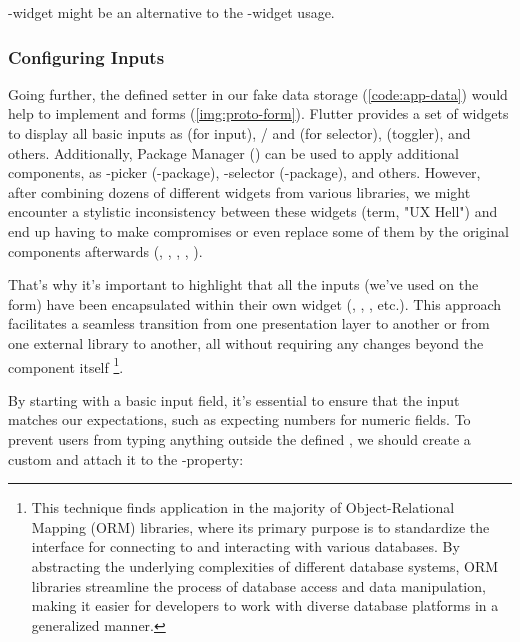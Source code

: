 \noindent {}-widget might be an alternative to the -widget usage.


\newpage
\subsubsection{Configuring Inputs}

Going further, the defined setter in our fake data storage (\cref{code:app-data}) would help to implement 
 and  forms  (\cref{img:proto-form}). Flutter provides a set of widgets to display all 
basic inputs as  (for input),  /  and  (for 
selector),  (toggler), and others. Additionally, Package Manager () can be used to apply additional
components, as -picker (-package), -selector (-package),
and others. However, after combining dozens of different widgets from various libraries, we might encounter a stylistic 
inconsistency between these widgets (term, "UX Hell") and end up having to make compromises or even replace some of them
by the original components afterwards (, , , , ).

That's why it's important to highlight that all the inputs (we've used on the form) have been encapsulated within 
their own widget (, , , etc.). This approach facilitates a seamless 
transition from one presentation layer to another or from one external library to another, all without requiring any 
changes beyond the component itself \footnote{This technique finds application in the majority of Object-Relational 
Mapping (ORM) libraries, where its primary purpose is to standardize the interface for connecting to and interacting 
with various databases. By abstracting the underlying complexities of different database systems, ORM libraries 
streamline the process of database access and data manipulation, making it easier for developers to work with diverse 
database platforms in a generalized manner.}.

By starting with a basic input field, it's essential to ensure that the input matches our expectations, such as 
expecting numbers for numeric fields. To prevent users from typing anything outside the defined , 
we should create a custom  and attach it to the -property:

